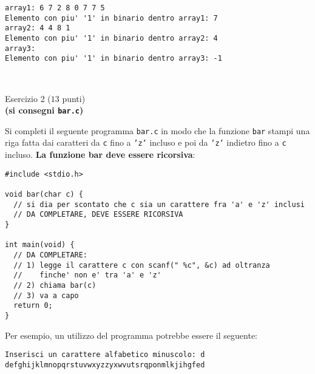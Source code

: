 \documentclass[12pt]{article}
\begin{document}
\begin{mdframed}[backgroundcolor=lightgrey] 
\begin{verbatim}
array1: 6 7 2 8 0 7 7 5 
Elemento con piu' '1' in binario dentro array1: 7
array2: 4 4 8 1 
Elemento con piu' '1' in binario dentro array2: 4
array3: 
Elemento con piu' '1' in binario dentro array3: -1
\end{verbatim}
\end{mdframed}

\mbox{}\\
\begin{center}{\Large Esercizio 2} ($13$ punti)\\
  \textbf{(si consegni \texttt{bar.c})}\end{center}
%
Si completi il seguente programma \texttt{bar.c} in modo che la funzione
\texttt{bar} stampi una riga fatta dai caratteri da \texttt{c} fino
a \texttt{'z'} incluso e poi da \texttt{'z'} indietro fino a \texttt{c} incluso.
\textbf{La funzione bar deve essere ricorsiva}:

\begin{center}
  \begin{lstlisting}[language=myC]
#include <stdio.h>

void bar(char c) {
  // si dia per scontato che c sia un carattere fra 'a' e 'z' inclusi
  // DA COMPLETARE, DEVE ESSERE RICORSIVA
}

int main(void) {
  // DA COMPLETARE:
  // 1) legge il carattere c con scanf(" %c", &c) ad oltranza
  //    finche' non e' tra 'a' e 'z'
  // 2) chiama bar(c)
  // 3) va a capo
  return 0;
}
  \end{lstlisting}
\end{center}

Per esempio, un utilizzo del programma potrebbe essere il seguente:

\begin{mdframed}[backgroundcolor=lightgrey] 
\begin{verbatim}
Inserisci un carattere alfabetico minuscolo: d
defghijklmnopqrstuvwxyzzyxwvutsrqponmlkjihgfed
\end{verbatim}
\end{mdframed}
\end{document}
